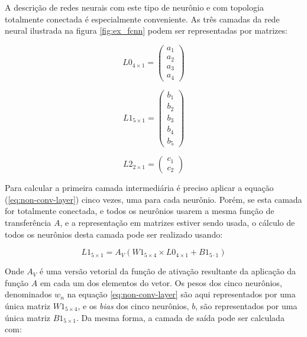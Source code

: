 A descrição de redes neurais com este tipo de neurônio e com topologia
totalmente conectada é especialmente conveniente. As três camadas
da rede neural ilustrada na figura \ref{fig:ex_fcnn} podem ser representadas
por matrizes:

\noindent\begin{minipage}{.333\linewidth}
	\begin{equation} \label{eq:l0}
		L0_{4 \times 1} =
			\begin{pmatrix}
				a_1 \\
				a_2 \\
				a_3 \\
				a_4
			\end{pmatrix}
	\end{equation}
\end{minipage}
\begin{minipage}{.333\linewidth}
	\begin{equation} \label{eq:l1}
		L1_{5 \times 1} =
			\begin{pmatrix}
				b_1 \\
				b_2 \\
				b_3 \\
				b_4 \\
				b_5
			\end{pmatrix}
	\end{equation}
\end{minipage}
\begin{minipage}{.333\linewidth}
	\begin{equation} \label{eq:l2}
		L2_{2 \times 1} =
			\begin{pmatrix}
				c_1 \\
				c_2
			\end{pmatrix}
	\end{equation}
\end{minipage}

Para calcular a primeira camada intermediária é preciso aplicar a equação
(\ref{eq:non-conv-layer}) cinco vezes, uma para cada neurônio. Porém, se
esta camada for totalmente conectada, e todos os neurônios usarem a
mesma função de transferência $A$, e a representação em matrizes estiver
sendo usada, o cálculo de todos os neurônios desta camada pode ser
realizado usando:

\begin{equation}
	L1_{5 \times 1}=A_V \left( W1_{5 \times 4} \times L0_{4 \times 1}
		+ B1_{5 \cdot 1} \right)
\end{equation}

Onde $A_V$ é uma versão vetorial da função de ativação resultante
da aplicação da função $A$ em cada um dos elementos do vetor.
Os pesos dos cinco neurônios, denominados $w_n$ na equação
\ref{eq:non-conv-layer} são aqui representados por uma única matriz
$W1_{5 \times 4}$, e os \emph{bias} dos cinco neurônios, $b$, são representados
por uma única matriz $B1_{5 \times 1}$. Da mesma forma, a camada de saída
pode ser calculada com:

